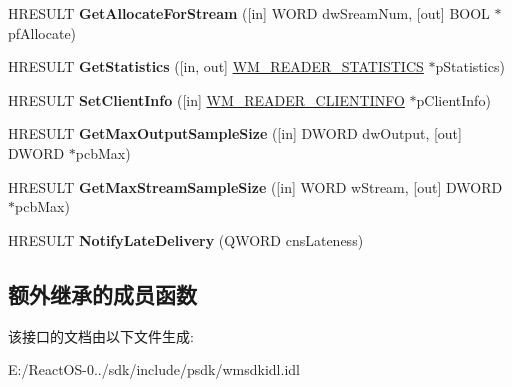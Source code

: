 \begin{DoxyCompactItemize}
H\+R\+E\+S\+U\+LT {\bfseries Get\+Allocate\+For\+Stream} (\mbox{[}in\mbox{]} W\+O\+RD dw\+Sream\+Num, \mbox{[}out\mbox{]} B\+O\+OL $\ast$pf\+Allocate)
\item 
\mbox{\label{interface_i_w_m_reader_advanced_a168fc3f4a980f8ab2a28632ae9e85525}} 
H\+R\+E\+S\+U\+LT {\bfseries Get\+Statistics} (\mbox{[}in, out\mbox{]} \hyperlink{struct___w_m_reader_statistics}{W\+M\+\_\+\+R\+E\+A\+D\+E\+R\+\_\+\+S\+T\+A\+T\+I\+S\+T\+I\+CS} $\ast$p\+Statistics)
\item 
\mbox{\label{interface_i_w_m_reader_advanced_a6c7d818180b1f50a3870cb565914f571}} 
H\+R\+E\+S\+U\+LT {\bfseries Set\+Client\+Info} (\mbox{[}in\mbox{]} \hyperlink{struct___w_m_reader_client_info}{W\+M\+\_\+\+R\+E\+A\+D\+E\+R\+\_\+\+C\+L\+I\+E\+N\+T\+I\+N\+FO} $\ast$p\+Client\+Info)
\item 
\mbox{\label{interface_i_w_m_reader_advanced_af4af96ea3fe18fb907438992fb443eed}} 
H\+R\+E\+S\+U\+LT {\bfseries Get\+Max\+Output\+Sample\+Size} (\mbox{[}in\mbox{]} D\+W\+O\+RD dw\+Output, \mbox{[}out\mbox{]} D\+W\+O\+RD $\ast$pcb\+Max)
\item 
\mbox{\label{interface_i_w_m_reader_advanced_a723d36e2b6e2abb7864444ca65d9f455}} 
H\+R\+E\+S\+U\+LT {\bfseries Get\+Max\+Stream\+Sample\+Size} (\mbox{[}in\mbox{]} W\+O\+RD w\+Stream, \mbox{[}out\mbox{]} D\+W\+O\+RD $\ast$pcb\+Max)
\item 
\mbox{\label{interface_i_w_m_reader_advanced_a8066d5aee128e897aab86c948052926e}} 
H\+R\+E\+S\+U\+LT {\bfseries Notify\+Late\+Delivery} (Q\+W\+O\+RD cns\+Lateness)
\end{DoxyCompactItemize}
\subsection*{额外继承的成员函数}


该接口的文档由以下文件生成\+:\begin{DoxyCompactItemize}
\item 
E\+:/\+React\+O\+S-\/0../sdk/include/psdk/wmsdkidl.\+idl\end{DoxyCompactItemize}
